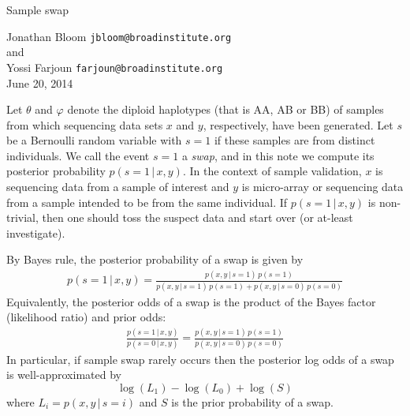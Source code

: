 \documentclass[12pt]{article}
\begin{document}
\begin{center}
{\Large Sample swap}

\medskip
Jonathan Bloom \texttt{jbloom@broadinstitute.org}\\ 
and \\
Yossi Farjoun \texttt{farjoun@broadinstitute.org} \\

June 20, 2014
\end{center}


Let $\theta$ and $\varphi$ denote the diploid haplotypes (that is AA, AB or BB) of samples from which sequencing data sets $x$ and $y$, respectively, have been generated.  Let $s$ be a Bernoulli random variable with $s=1$ if these samples are from distinct individuals.  We call the event $s=1$ a {\em swap}, and in this note we compute its posterior probability $p(s = 1 \, | \, x, y)$.  In the context of sample validation, $x$ is sequencing data from a sample of interest and $y$ is micro-array or sequencing data from a sample intended to be from the same individual.  If $p(s = 1 \, | \, x, y)$ is non-trivial, then one should toss the suspect data and start over (or at-least investigate).

By Bayes rule, the posterior probability of a swap is given by
\begin{align}
\label{prob_swap}
p(s = 1 \, | \, x,y) = \frac{p(x,y \, | \, s = 1) \, p(s=1)}{p(x,y \, | \, s = 1) \, p(s = 1) + p(x,y \, | \, s = 0) \, p(s =0)}
\end{align}
Equivalently, the posterior odds of a swap is the product of the Bayes factor (likelihood ratio) and prior odds:
\begin{align}
\label{odds_swap}
\frac{p(s = 1 \, | \, x,y)}{p(s = 0 \, | \, x,y)} = \frac{p(x,y \, | \, s = 1) \, p(s = 1)}{p(x,y \, | \, s = 0) \, p(s = 0)}
\end{align}
In particular, if sample swap rarely occurs then the posterior log odds of a swap is well-approximated by
\[
\log(L_1) - \log(L_0) + \log(S)
\]
where $L_i = p(x,y \, | \, s=i)$ and $S$ is the prior probability of a swap.
\end{document}

